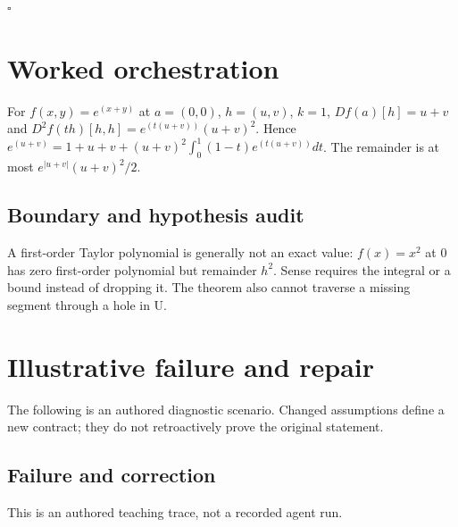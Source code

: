 \documentclass[preprint,12pt,aps,pra,showkeys,amsmath,amssymb,superscriptaddress,floatfix]{revtex4-2}
\theoremstyle{definition}
\theoremstyle{remark}
\begin{document}
\hfill$\square$

\section{Worked orchestration}

For \(f(x,y)=e^{(x+y)}\) at \(a=(0,0)\), \(h=(u,v)\), \(k=1\),
\(Df(a)[h]=u+v\) and \(D^{2}f(th)[h,h]=e^(t(u+v))(u+v)^{2}\). Hence
\(e^{(u+v)}=1+u+v+(u+v)^{2}\int _{0}^{1}(1-t)e^(t(u+v))dt\). The
remainder is at most \(e^|u+v|(u+v)^{2}/2\).

\subsection{Boundary and hypothesis audit}

A first-order Taylor polynomial is generally not an exact value:
\(f(x)=x^{2}\) at 0 has zero first-order polynomial but remainder
\(h^{2}\). Sense requires the integral or a bound instead of dropping
it. The theorem also cannot traverse a missing segment through a hole in
U.

\section{Illustrative failure and repair}

The following is an authored diagnostic scenario. Changed assumptions
define a new contract; they do not retroactively prove the original
statement.

\subsection{Failure and correction}
This is an authored teaching trace, not a recorded agent run.
\end{document}
